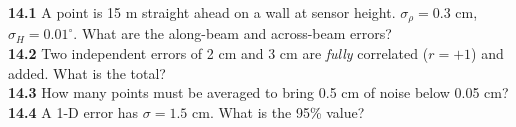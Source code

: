 \begin{tryit}
\textbf{14.1} A point is 15 m straight ahead on a wall at sensor height. $\sigma_\rho=0.3$ cm, $\sigma_H=0.01^\circ$. What are the along-beam and across-beam errors?\\
\textbf{14.2} Two independent errors of 2 cm and 3 cm are \emph{fully} correlated ($r=+1$) and added. What is the total?\\
\textbf{14.3} How many points must be averaged to bring 0.5 cm of noise below 0.05 cm?\\
\textbf{14.4} A 1-D error has $\sigma=1.5$ cm. What is the 95\% value?
\end{tryit}

